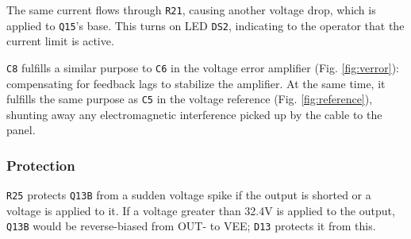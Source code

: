 \begin{multicols}{2}
The same current flows through \texttt{R21}, causing another voltage drop,
which is applied to \texttt{Q15}'s base. This turns on LED \texttt{DS2},
indicating to the operator that the current limit is active.

\texttt{C8} fulfills a similar purpose to \texttt{C6} in the voltage error
amplifier (Fig. \ref{fig:verror}): compensating for feedback lags to stabilize
the amplifier. At the same time, it fulfills the same purpose as \texttt{C5} in
the voltage reference (Fig. \ref{fig:reference}), shunting away any
electromagnetic interference picked up by the cable to the panel.

\subsubsection{Protection}
\texttt{R25} protects \texttt{Q13B} from a sudden voltage spike if the output
is shorted or a voltage is applied to it. If a voltage greater than 32.4\;V
is applied to the output,
\texttt{Q13B} would be reverse-biased from
OUT- to VEE; \texttt{D13} protects it from this.

\end{multicols}

